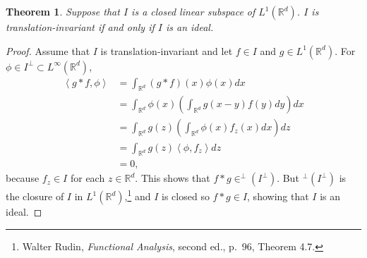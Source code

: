 \documentclass{article}
\newcommand{\inner}[2]{\left\langle #1, #2 \right\rangle}
\newtheorem{theorem}{Theorem}
\theoremstyle{definition}
\begin{document}
\begin{theorem}
Suppose that $I$ is a closed linear subspace of $L^1(\mathbb{R}^d)$. $I$ is translation-invariant if and only if $I$ is an ideal.
\end{theorem}
\begin{proof}
Assume that $I$ is translation-invariant and let $f \in I$ and $g \in L^1(\mathbb{R}^d)$.
For $\phi \in I^\perp \subset L^\infty(\mathbb{R}^d)$,
\begin{align*}
\inner{g*f}{\phi}&=\int_{\mathbb{R}^d} (g*f)(x) \phi(x) dx\\
&=\int_{\mathbb{R}^d} \phi(x) \left( \int_{\mathbb{R}^d} g(x-y) f(y) dy \right) dx\\
&=\int_{\mathbb{R}^d} g(z) \left( \int_{\mathbb{R}^d} \phi(x) f_z(x) dx \right) dz\\
&=\int_{\mathbb{R}^d} g(z) \inner{\phi}{f_z} dz\\
&=0,
\end{align*}
because $f_z \in I$ for each $z \in \mathbb{R}^d$. This shows that $f*g \in ^\perp(I^\perp)$.
But $^\perp(I^\perp)$ is the closure of $I$ in $L^1(\mathbb{R}^d)$,\footnote{Walter
Rudin, {\em Functional Analysis}, second ed., p.~96, Theorem 4.7.}  and $I$ is closed so
$f*g \in I$, showing that $I$ is an ideal.


\end{proof}
\end{document}
